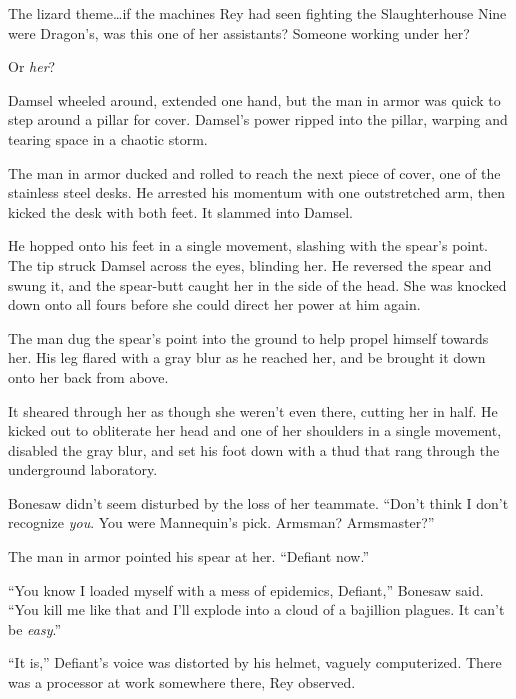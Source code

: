 The lizard theme\ldots if the machines Rey had seen fighting the Slaughterhouse Nine were Dragon's, was this one of her assistants?  Someone working under her?



Or \emph{her}?



Damsel wheeled around, extended one hand, but the man in armor was quick to step around a pillar for cover.  Damsel's power ripped into the pillar, warping and tearing space in a chaotic storm.



The man in armor ducked and rolled to reach the next piece of cover, one of the stainless steel desks.  He arrested his momentum with one outstretched arm, then kicked the desk with both feet.  It slammed into Damsel.



He hopped onto his feet in a single movement, slashing with the spear's point.  The tip struck Damsel across the eyes, blinding her.  He reversed the spear and swung it, and the spear-butt caught her in the side of the head.  She was knocked down onto all fours before she could direct her power at him again.



The man dug the spear's point into the ground to help propel himself towards her.  His leg flared with a gray blur as he reached her, and be brought it down onto her back from above.



It sheared through her as though she weren't even there, cutting her in half.  He kicked out to obliterate her head and one of her shoulders in a single movement, disabled the gray blur, and set his foot down with a thud that rang through the underground laboratory.



Bonesaw didn't seem disturbed by the loss of her teammate.  ``Don't think I don't recognize \emph{you}.  You were Mannequin's pick.  Armsman?  Armsmaster?''



The man in armor pointed his spear at her.  ``Defiant now.''



``You know I loaded myself with a mess of epidemics, Defiant,'' Bonesaw said.  ``You kill me like that and I'll explode into a cloud of a bajillion plagues.  It can't be \emph{easy}.''



``It is,'' Defiant's voice was distorted by his helmet, vaguely computerized.  There was a processor at work somewhere there, Rey observed.



